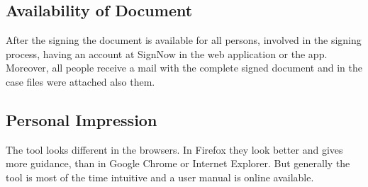 \subsection{Availability of Document}
After the signing the document is available for all persons, involved in the signing process, having an account at SignNow in the web application or the \gls{app}. Moreover, all people receive a mail with the complete signed document and in the case files were attached also them. 

\subsection{Personal Impression}
The tool looks different in the browsers. In Firefox they look better and gives more guidance, than in Google Chrome or Internet Explorer. But generally the tool is most of the time intuitive and a user manual is online available. 